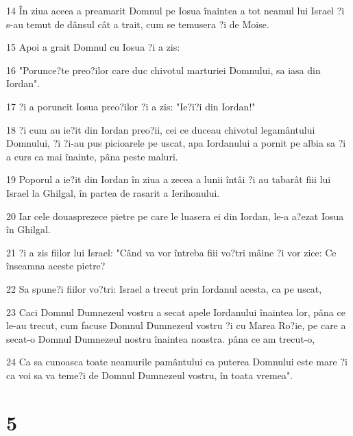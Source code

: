 \par 14 În ziua aceea a preamarit Domnul pe Iosua înaintea a tot neamul lui Israel ?i s-au temut de dânsul cât a trait, cum se temusera ?i de Moise.
\par 15 Apoi a grait Domnul cu Iosua ?i a zis:
\par 16 "Porunce?te preo?ilor care duc chivotul marturiei Domnului, sa iasa din Iordan".
\par 17 ?i a poruncit Iosua preo?ilor ?i a zis: "Ie?i?i din Iordan!"
\par 18 ?i cum au ie?it din Iordan preo?ii, cei ce duceau chivotul legamântului Domnului, ?i ?i-au pus picioarele pe uscat, apa Iordanului a pornit pe albia sa ?i a curs ca mai înainte, pâna peste maluri.
\par 19 Poporul a ie?it din Iordan în ziua a zecea a lunii întâi ?i au tabarât fiii lui Israel la Ghilgal, în partea de rasarit a Ierihonului.
\par 20 Iar cele douasprezece pietre pe care le luasera ei din Iordan, le-a a?ezat Iosua în Ghilgal.
\par 21 ?i a zis fiilor lui Israel: "Când va vor întreba fiii vo?tri mâine ?i vor zice: Ce înseamna aceste pietre?
\par 22 Sa spune?i fiilor vo?tri: Israel a trecut prin Iordanul acesta, ca pe uscat,
\par 23 Caci Domnul Dumnezeul vostru a secat apele Iordanului înaintea lor, pâna ce le-au trecut, cum facuse Domnul Dumnezeul vostru ?i cu Marea Ro?ie, pe care a secat-o Domnul Dumnezeul nostru înaintea noastra. pâna ce am trecut-o,
\par 24 Ca sa cunoasca toate neamurile pamântului ca puterea Domnului este mare ?i ca voi sa va teme?i de Domnul Dumnezeul vostru, în toata vremea".

\chapter{5}

